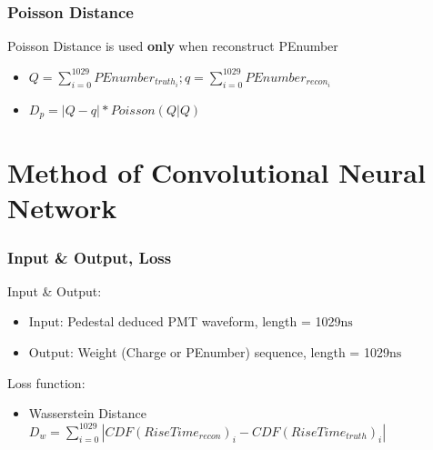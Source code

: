 \documentclass{beamer}
\begin{document}
\begin{frame}
\frametitle{Poisson Distance}
\hspace{4mm}Poisson Distance is used \textbf{only} when reconstruct PEnumber
\begin{itemize}
    \item $Q = \sum_{i=0}^{1029}PEnumber_{truth_i}; q = \sum_{i=0}^{1029}PEnumber_{recon_i}$
    \item $D_{p} = |Q-q|*Poisson(Q|Q)$
\end{itemize}
\end{frame}

\section{Method of Convolutional Neural Network}

\begin{frame}
\frametitle{Input \& Output, Loss}
\hspace{4mm}Input \& Output:
\begin{itemize}
    \item Input: Pedestal deduced PMT waveform, length = 1029$\mathrm{ns}$
    \item Output: Weight (Charge or PEnumber) sequence, length = 1029$\mathrm{ns}$
\end{itemize}
\hspace{4mm}Loss function:
\begin{itemize}
    \item Wasserstein Distance \\ $D_{w}=\sum_{i=0}^{1029}|CDF(RiseTime_{recon})_{i} - CDF(RiseTime_{truth})_{i}|$
\end{itemize}
\end{frame}
\end{document}
